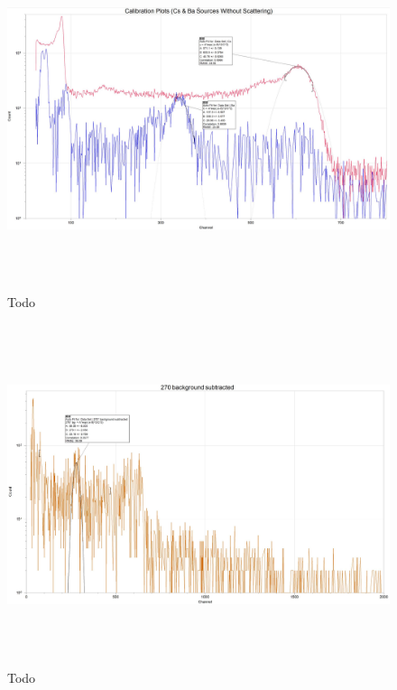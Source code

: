 \documentclass[fleqn]{article}
\begin{document}
  \begin{figure}[htbp]
    \includegraphics[height=10cm, width=18cm]{Three.JPG}
    \caption{
      Todo
    }
  \end{figure}

  \pagebreak

  \begin{figure}[htbp]
    \includegraphics[height=10cm, width=18cm]{Four.JPG}
    \caption{
      Todo
    }
  \end{figure}

  \pagebreak
\end{document}
